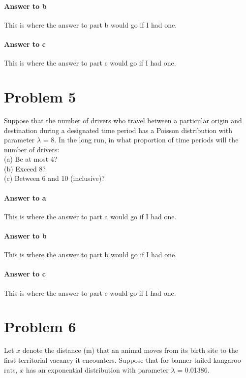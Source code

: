 \documentclass{article}
\begin{document}
	\paragraph{Answer to b}
	This is where the answer to part b would go if I had one.
	
	\paragraph{Answer to c}
	This is where the answer to part c would go if I had one.
	
\section*{Problem 5}
	
	Suppose that the number of drivers who travel between a particular origin and destination
	during a designated time period has a Poisson distribution with parameter $\lambda$ = 8. In the 
	long run, in what proportion of time periods will the number of drivers: \\
	
	\noindent (a) Be at most 4? \\
	(b) Exceed 8? \\
	(c) Between 6 and 10 (inclusive)?
	
	\paragraph{Answer to a}
	This is where the answer to part a would go if I had one.
	
	\paragraph{Answer to b}
	This is where the answer to part b would go if I had one.
	
	\paragraph{Answer to c}
	This is where the answer to part c would go if I had one.
	
\section*{Problem 6}

	Let $x$ denote the distance (m) that an animal moves from its birth site to the first territorial
	vacancy it encounters. Suppose that for banner-tailed kangaroo rats, $x$ has an exponential 
	distribution with parameter $\lambda$ = 0.01386. \\
	
\end{document}
